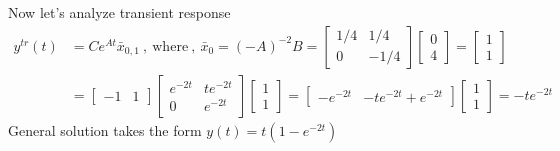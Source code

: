 \documentclass[twoside]{article}
\begin{document}
Now let's analyze transient response
\begin{align*} 
y^{tr}(t) &= C e^{A t} \bar{x}_{0,1} \ , \ \mathrm{where} \ , \  \bar{x}_0 = \left(-A \right)^{-2} B = \begin{bmatrix} 1/4 & 1/4 \\ 0 & -1/4 \end{bmatrix}  \begin{bmatrix} 0 \\ 4 \end{bmatrix} = \begin{bmatrix} 1 \\ 1 \end{bmatrix} 
\\
&= \begin{bmatrix} -1 & 1 \end{bmatrix} \begin{bmatrix} e^{-2 t} & t e^{-2 t} \\ 0 &e^{-2 t} \end{bmatrix} \begin{bmatrix} 1 \\ 1 \end{bmatrix} 
= \begin{bmatrix} -e^{-2 t} & -t e^{-2 t} + e^{-2 t} \end{bmatrix} \begin{bmatrix} 1 \\ 1 \end{bmatrix}  
= - t e^{-2 t} 
\end{align*}
%
General solution takes the form $y(t) = t \left(1 - e^{-2 t} \right)$
\end{document}
